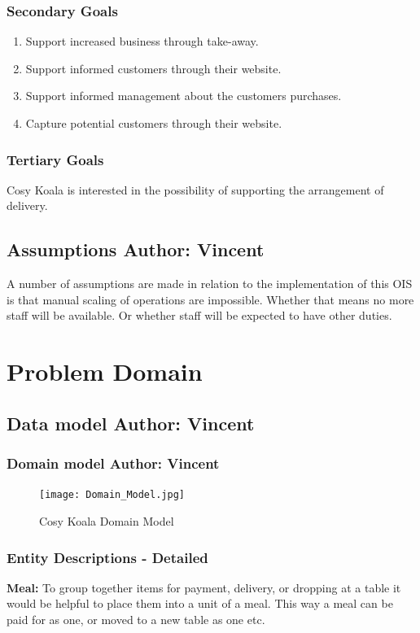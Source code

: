 \documentclass{article}
\begin{document}
\subsubsection{Secondary Goals}
\begin{enumerate}
    \item Support increased business through take-away.
    \item Support informed customers through their website.
    \item Support informed management about the customers purchases.
    \item Capture potential customers through their website.
\end{enumerate}
\subsubsection{Tertiary Goals}
Cosy Koala is interested in the possibility of supporting the arrangement of delivery.

\subsection{Assumptions \normalsize\textbf{Author: Vincent}}
A number of assumptions are made in relation to the implementation of this OIS is that manual scaling of operations are impossible. Whether that means no more staff will be available. Or whether staff will be expected to have other duties.


\clearpage

\section{Problem Domain}

\subsection{Data model \normalsize\textbf{Author: Vincent}}


\subsubsection{Domain model \normalsize\textbf{Author: Vincent}}
\begin{figure}[!ht]
    \centering
    \texttt{[image: Domain\_Model.jpg]}
    \caption{Cosy Koala Domain Model}
    \label{fig:Domain_Model}
\end{figure}

\subsubsection{Entity Descriptions - Detailed}
\textbf{Meal:} To group together items for payment, delivery, or dropping at a table it would be helpful to place them into a unit of a meal. This way a meal can be paid for as one, or moved to a new table as one etc.
\end{document}
